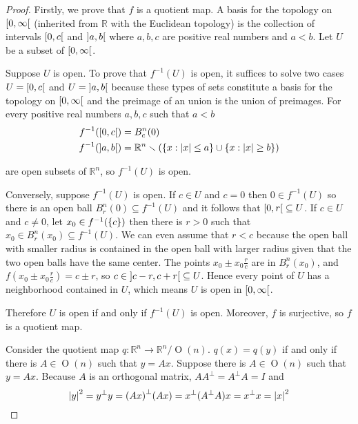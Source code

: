 \begin{proof}
    Firstly, we prove that $f$ is a quotient map. A basis for the topology on $\left[{0, \infty}\right[$ (inherited from $\mathbb{R}$ with the Euclidean topology) is the collection of intervals $\left[{0, c}\right[$ and $\left]{a, b}\right[$ where $a, b, c$ are positive real numbers and $a < b$. Let $U$ be a subset of $\left[{0, \infty}\right[$.

    Suppose $U$ is open. To prove that $f^{-1}(U)$ is open, it suffices to solve two cases $U = \left[{0, c}\right[$ and $U = \left]{a, b}\right[$ because these types of sets constitute a basis for the topology on $\left[{0, \infty}\right[$ and the preimage of an union is the union of preimages. For every positive real numbers $a, b, c$ such that $a < b$
    \begin{align*}
        f^{-1}(\left[{0, c}\right[) & = B^{n}_{c}(0)                                                                                           \\
        f^{-1}(\left]{a, b}\right[)  & = \mathbb{R}^{n} \smallsetminus \left( \left\{{x : \left\vert{x}\right\vert \leq a}\right\} \cup \left\{{x : \left\vert{x}\right\vert \geq b}\right\} \right)
    \end{align*}

    are open subsets of $\mathbb{R}^{n}$, so $f^{-1}(U)$ is open.

    Conversely, suppose $f^{-1}(U)$ is open. If $c\in U$ and $c = 0$ then $0 \in f^{-1}(U)$ so there is an open ball $B^{n}_{r}(0) \subseteq f^{-1}(U)$ and it follows that $\left[{0, r}\right[ \subseteq U$. If $c\in U$ and $c \ne 0$, let $x_{0} \in f^{-1}(\left\{{c}\right\})$ then there is $r > 0$ such that $x_{0} \in B^{n}_{r}(x_{0}) \subseteq f^{-1}(U)$. We can even assume that $r < c$ because the open ball with smaller radius is contained in the open ball with larger radius given that the two open balls have the same center. The points $x_{0} \pm x_{0}\frac{r}{c}$ are in $B^{n}_{r}(x_{0})$, and $f\left(x_{0} \pm x_{0}\frac{r}{c}\right) = c \pm r$, so $c \in \left]{c - r, c + r}\right[ \subseteq U$. Hence every point of $U$ has a neighborhood contained in $U$, which means $U$ is open in $\left[{0, \infty}\right[$.

    Therefore $U$ is open if and only if $f^{-1}(U)$ is open. Moreover, $f$ is surjective, so $f$ is a quotient map.

    Consider the quotient map $q: \mathbb{R}^{n} \to \mathbb{R}^{n}/\operatorname{O}(n)$. $q(x) = q(y)$ if and only if there is $A \in \operatorname{O}(n)$ such that $y = Ax$. Suppose there is $A \in \operatorname{O}(n)$ such that $y = Ax$. Because $A$ is an orthogonal matrix, $AA^{\bot} = A^{\bot}A = I$ and
    \begin{equation*}
        \left\vert{y}\right\vert^{2} = y^{\bot}y = {(Ax)}^{\bot}(Ax) = x^{\bot}(A^{\bot}A)x = x^{\bot}x = \left\vert{x}\right\vert^{2}
    \end{equation*}


\end{proof}
